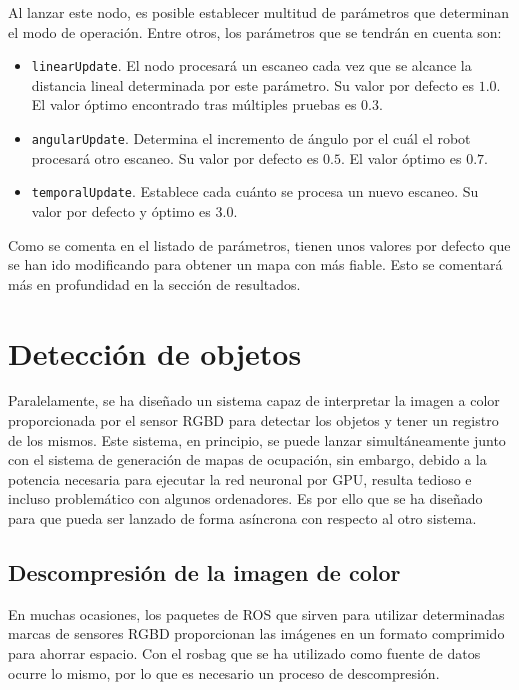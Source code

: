 Al lanzar este nodo, es posible establecer multitud de parámetros que determinan el modo de operación. Entre otros, los parámetros que se tendrán en cuenta son:

\begin{itemize}

	\item \texttt{linearUpdate}. El nodo procesará un escaneo cada vez que se alcance la distancia lineal determinada por este parámetro. Su valor por defecto es $1.0$. El valor óptimo encontrado tras múltiples pruebas es $0.3$.
	\item \texttt{angularUpdate}. Determina el incremento de ángulo por el cuál el robot procesará otro escaneo. Su valor por defecto es $0.5$. El valor óptimo es $0.7$.
	\item \texttt{temporalUpdate}. Establece cada cuánto se procesa un nuevo escaneo. Su valor por defecto y óptimo es $3.0$.

\end{itemize}

Como se comenta en el listado de parámetros, tienen unos valores por defecto que se han ido modificando para obtener un mapa con más fiable. Esto se comentará más en profundidad en la sección de resultados.\\

\section{Detección de objetos}

Paralelamente, se ha diseñado un sistema capaz de interpretar la imagen a color proporcionada por el sensor RGBD para detectar los objetos y tener un registro de los mismos. Este sistema, en principio, se puede lanzar simultáneamente junto con el sistema de generación de mapas de ocupación, sin embargo, debido a la potencia necesaria para ejecutar la red neuronal por GPU, resulta tedioso e incluso problemático con algunos ordenadores. Es por ello que se ha diseñado para que pueda ser lanzado de forma asíncrona con respecto al otro sistema.\\

\subsection{Descompresión de la imagen de color}

En muchas ocasiones, los paquetes de ROS que sirven para utilizar determinadas marcas de sensores RGBD proporcionan las imágenes en un formato comprimido para ahorrar espacio. Con el rosbag que se ha utilizado como fuente de datos ocurre lo mismo, por lo que es necesario un proceso de descompresión.\\


